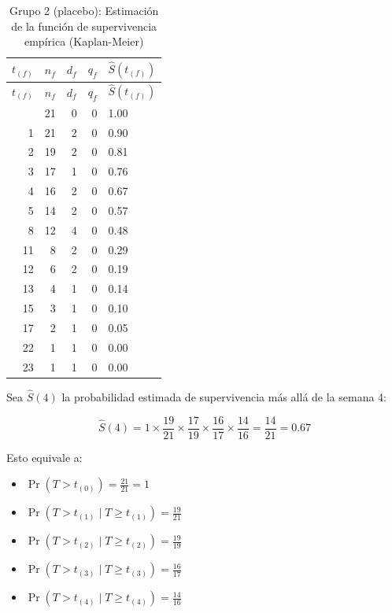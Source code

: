 \documentclass[
]{article}
\providecommand{\tightlist}{%
  \setlength{\itemsep}{0pt}\setlength{\parskip}{0pt}}
\begin{document}
\begin{tcolorbox}[enhanced jigsaw, colbacktitle=quarto-callout-note-color!10!white, bottomtitle=1mm, toptitle=1mm, title=\textcolor{quarto-callout-note-color}{\faInfo}\hspace{0.5em}{Ejemplo: Cálculo de la función de supervivencia empírica}, opacitybacktitle=0.6, bottomrule=.15mm, colback=white, opacityback=0, left=2mm, toprule=.15mm, coltitle=black, rightrule=.15mm, leftrule=.75mm, titlerule=0mm, arc=.35mm, colframe=quarto-callout-note-color-frame, breakable]

\begin{longtable}[]{@{}rrrrl@{}}
\caption{Grupo 2 (placebo): Estimación de la función de supervivencia
empírica (Kaplan-Meier)}\tabularnewline
\toprule\noalign{}
\(t_{(f)}\) & \(n_f\) & \(d_f\) & \(q_f\) & \(\hat{S}(t_{(f)})\) \\
\midrule\noalign{}
\endfirsthead
\toprule\noalign{}
\(t_{(f)}\) & \(n_f\) & \(d_f\) & \(q_f\) & \(\hat{S}(t_{(f)})\) \\
\midrule\noalign{}
\endhead
\bottomrule\noalign{}
\endlastfoot
0 & 21 & 0 & 0 & 1.00 \\
1 & 21 & 2 & 0 & 0.90 \\
2 & 19 & 2 & 0 & 0.81 \\
3 & 17 & 1 & 0 & 0.76 \\
4 & 16 & 2 & 0 & 0.67 \\
5 & 14 & 2 & 0 & 0.57 \\
8 & 12 & 4 & 0 & 0.48 \\
11 & 8 & 2 & 0 & 0.29 \\
12 & 6 & 2 & 0 & 0.19 \\
13 & 4 & 1 & 0 & 0.14 \\
15 & 3 & 1 & 0 & 0.10 \\
17 & 2 & 1 & 0 & 0.05 \\
22 & 1 & 1 & 0 & 0.00 \\
23 & 1 & 1 & 0 & 0.00 \\
\end{longtable}

Sea \(\hat{S}(4)\) la probabilidad estimada de supervivencia más allá de
la semana 4:

\[
\hat{S}(4) = 1 \times \frac{19}{21} \times \frac{17}{19} \times \frac{16}{17} \times \frac{14}{16} = \frac{14}{21} = 0.67
\]

Esto equivale a:

\begin{itemize}
\tightlist
\item
  \(\Pr(T > t_{(0)}) = \frac{21}{21}=1\)
\item
  \(\Pr(T > t_{(1)} \mid T \ge t_{(1)}) = \frac{19}{21}\)
\item
  \(\Pr(T > t_{(2)} \mid T \ge t_{(2)}) = \frac{19}{19}\)
\item
  \(\Pr(T > t_{(3)} \mid T \ge t_{(3)}) = \frac{16}{17}\)
\item
  \(\Pr(T > t_{(4)} \mid T \ge t_{(4)}) = \frac{14}{16}\)
\end{itemize}


\end{tcolorbox}
\end{document}
